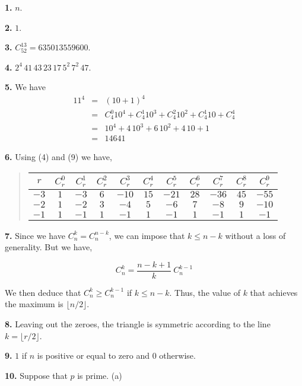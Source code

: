 \documentclass[a4paper,12pt]{article}
\newcommand{\newpar}[1]{\bigskip \noindent \textbf{#1.}}
\newcommand{\subpar}[1]{\medskip \noindent (#1)}
\begin{document}
\newpar{1} $n$.

\newpar{2} $1$.

\newpar{3} $C_{52}^{13} = 635013559600$.

\newpar{4} $2^4\,41\,43\,23\,17\,5^2\,7^2\,47$.

\newpar{5} We have
\begin{eqnarray*}
  11^4 &=& (10 + 1)^4 \\
  &=& C_4^0 10^4 + C_4^1 10^3 + C_4^2 10^2 + C_4^1 10 + C_4^4 \\
  &=& 10^4 + 4\,10^3 + 6\,10^2 + 4\,10 + 1 \\
  &=& 14641
\end{eqnarray*}

\newpar{6} Using (4) and (9) we have,
\begin{quote}
  \begin{tabular}{|c|c|c|c|c|c|c|c|c|c|c|}
    \hline $r$ & $C_r^0$ & $C_r^1$ & $C_r^2$ & $C_r^3$ & $C_r^4$ &
    $C_r^5$ & $C_r^6$ & $C_r^7$ & $C_r^8$ & $C_r^9$ \\
    \hline $-3$ & $1$ & $-3$ & $6$ & $-10$ & $15$ & $-21$ & $28$ &
    $-36$ & $45$ & $-55$ \\
    \hline $-2$ & $1$ & $-2$ & $3$ & $-4$ & $5$ & $-6$ & $7$ & $-8$ &
    $9$ & $-10$ \\
    \hline $-1$ & $1$ & $-1$ & $1$ & $-1$ & $1$ & $-1$ & $1$ & $-1$ &
    $1$ & $-1$ \\
    \hline
  \end{tabular}
\end{quote}

\newpar{7}  Since we have $C_n^k = C_n^{n-k}$, we can impose that $k
\le n-k$ without a loss of generality.  But we have,

\[ C_n^k = \frac{n-k+1}{k}\ C_n^{k-1} \]

We then deduce that $C_n^k \ge C_n^{k-1}$ if $k \le n-k$.  Thus, the
value of $k$ that achieves the maximum is $\lfloor n/2\rfloor$.

\newpar{8} Leaving out the zeroes, the triangle is symmetric according
to the line $k = \lfloor r/2\rfloor$.

\newpar{9} $1$ if $n$ is positive or equal to zero and $0$ otherwise.

\newpar{10} Suppose that $p$ is prime.
\subpar{a} 
\end{document}
